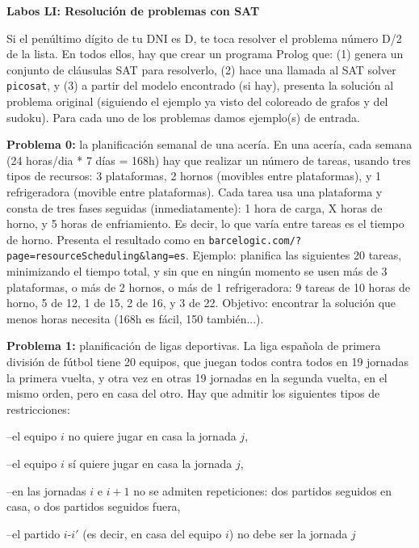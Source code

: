 \documentclass[11pt]{article}
\begin{document}
\thispagestyle{empty}

\begin{center}
{\Large\bf Labos LI: Resolución de problemas con SAT} \qquad 
\end{center}


Si el penúltimo dígito de tu DNI es D, te toca resolver el problema número D/2 de la lista.
En todos ellos, hay que crear un programa Prolog que: (1) genera un conjunto de cláusulas SAT
para resolverlo, (2) hace una llamada al SAT solver \texttt{picosat}, y (3) a partir del modelo
encontrado (si hay), presenta la solución al problema original (siguiendo el ejemplo ya visto del
coloreado de grafos y del sudoku). Para cada uno de los problemas damos ejemplo(s) de entrada.
\medskip

\textbf{Problema 0:} la planificación semanal de una acería. En una acería, cada semana (24 horas/dia *
7 días = 168h) hay que realizar un número de tareas, usando tres tipos de recursos: 3 plataformas,
2 hornos (movibles entre plataformas), y 1 refrigeradora (movible entre plataformas). Cada tarea
usa una plataforma y consta de tres fases seguidas (inmediatamente): 1 hora de carga, X horas de
horno, y 5 horas de enfriamiento. Es decir, lo que varía entre tareas es el tiempo de horno. Presenta
el resultado como en \texttt{barcelogic.com/?page=resourceScheduling\&lang=es}. Ejemplo: planifica
las siguientes 20 tareas, minimizando el tiempo total, y sin que en ningún momento se usen más
de 3 plataformas, o más de 2 hornos, o más de 1 refrigeradora: 9 tareas de 10 horas de horno, 5
de 12, 1 de 15, 2 de 16, y 3 de 22. Objetivo: encontrar la solución que menos horas necesita (168h es fácil,
150 también...).
\medskip


\textbf{Problema 1:} planificación de ligas deportivas. La liga española de primera división de fútbol tiene
20 equipos, que juegan todos contra todos en 19 jornadas la primera vuelta, y otra vez en otras
19 jornadas en la segunda vuelta, en el mismo orden, pero en casa del otro. Hay que admitir los
siguientes tipos de restricciones:

–el equipo $i$ no quiere jugar en casa la jornada $j$,

–el equipo $i$ sí quiere jugar en casa la jornada $j$,

–en las jornadas $i$ e $i + 1$ no se admiten repeticiones: dos partidos seguidos en casa, o dos partidos
seguidos fuera,

–el partido $i$-$i'$ (es decir, en casa del equipo $i$) no debe ser la jornada $j$
\end{document}
